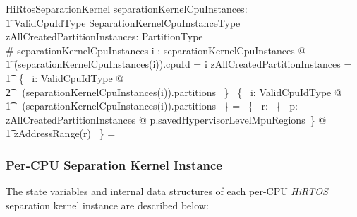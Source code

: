 \documentclass[11pt,letterpaper,twoside,openany]{book}
\begin{document}
\begin{schema}{HiRtosSeparationKernel}
    separationKernelCpuInstances: \\
    \t1 ValidCpuIdType \finj SeparationKernelCpuInstanceType \\
    zAllCreatedPartitionInstances: \finset PartitionType \\
\where
    \# separationKernelCpuInstances 
\also
    \forall i : \dom separationKernelCpuInstances @ \\
\t1   (separationKernelCpuInstances(i)).cpuId = i
\also
    zAllCreatedPartitionInstances = \\
\t1    \bigcup~\{~ i: ValidCpuIdType @ \\
\t2    \ran~ (separationKernelCpuInstances(i)).partitions ~\}
\also
    \bigcap~\{~ i: ValidCpuIdType @ \\
\t1    \ran~ (separationKernelCpuInstances(i)).partitions ~\} = \emptyset
\also
    \bigcap~\{~ r: \bigcup~\{~ p: zAllCreatedPartitionInstances @ p.savedHypervisorLevelMpuRegions~\} @ \\
    \t1 zAddressRange(r) ~\} = \emptyset
\end{schema}

\subsubsection{Per-CPU Separation Kernel Instance}

The state variables and internal data structures of each per-CPU \emph{HiRTOS} separation kernel instance
are described below:
\end{document}
